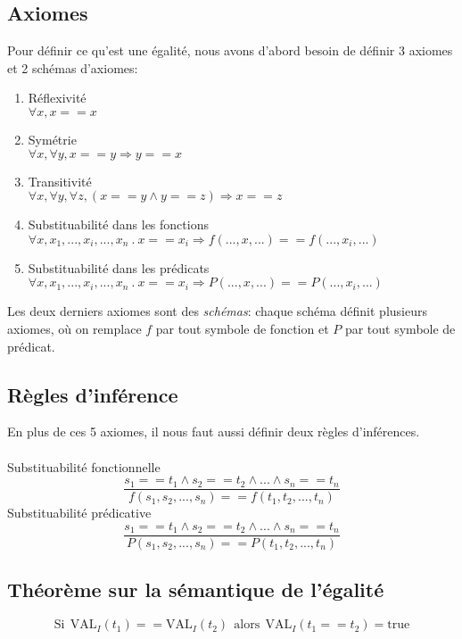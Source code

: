 {\subsection{Axiomes} 
Pour définir ce qu'est une égalité, nous avons d'abord besoin de définir 3 axiomes et 2 schémas d'axiomes:
\begin{enumerate}
\item Réflexivité \\$\forall x, x==x$
\item Symétrie \\$\forall x, \forall y, x==y \Rightarrow y==x$
\item Transitivité \\$\forall x, \forall y, \forall z, (x==y \land y==z) \Rightarrow x==z$
\item Substituabilité dans les fonctions\\$\forall x, x_{1}, ..., x_i, ..., x_{n}\ .\ x==x_i \Rightarrow f(..., x, ...) == f(..., x_i, ...)$
\item Substituabilité dans les prédicats\\$\forall x, x_{1}, ..., x_i, ..., x_{n}\ .\ x==x_i \Rightarrow P(..., x, ...) == P(..., x_i, ...)$ 
\end{enumerate}
Les deux derniers axiomes sont des {\em schémas}: chaque schéma définit plusieurs axiomes, où on remplace $f$ par tout symbole de fonction et $P$ par tout symbole de prédicat.

\subsection{Règles d'inférence}
En plus de ces 5 axiomes, il nous faut aussi définir deux règles d'inférences.\\ \\
Substituabilité fonctionnelle 
	$$ \frac{s_{1}==t_{1} \land s_{2}==t_{2} \land ... \land s_{n}==t_{n}}{f(s_{1},s_{2},...,s_{n}) == f(t_{1},t_{2},...,t_{n})}$$ 
	Substituabilité prédicative 
	$$ \frac{s_{1}==t_{1} \land s_{2}==t_{2} \land ... \land s_{n}==t_{n}}{P(s_{1},s_{2},...,s_{n}) == P(t_{1},t_{2},...,t_{n})}$$ 

\subsection{Théorème sur la sémantique de l'égalité}

$$\mathrm{Si}\ \ \mathrm{VAL}_{I}(t_{1}) ==  \mathrm{VAL}_{I}(t_{2}) \ \ \mathrm{alors}\ \  \mathrm{VAL}_{I}(t_{1} == t_{2}) = \mathrm{true}$$

}
